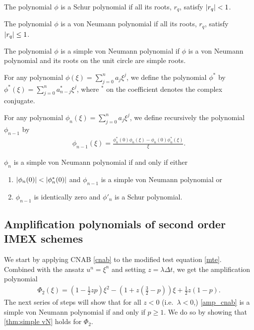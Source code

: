 \begin{definition}
	The polynomial $\phi$ is a Schur polynomial if all its roots, $r_q$, satisfy $\left|r_q\right| < 1$.
\end{definition}
\begin{definition}
        The polynomial $\phi$ is a von Neumann polynomial if all its roots, $r_q$, satisfy $\left|r_q\right|\leq 1$.
\end{definition}
\begin{definition}
	The polynomial $\phi$ is a simple von Neumann polynomial if $\phi$ is a von Neumann polynomial and its roots on the unit circle are simple roots.
\end{definition}
\begin{definition}
	For any polynomial $\phi(\xi) = \sum^n_{j=0} a_j\xi^j$, we define the polynomial $\phi^*$ by $\phi^*(\xi) = \sum^n_{j=0} a^*_{n-j} \xi^j$, where $^*$ on the coefficient denotes the complex conjugate.
\label{defn:conj}
\end{definition}
\begin{definition}
	For any polynomial $\phi_n(\xi) = \sum^n_{j=0} a_j\xi^j$, we define recursively the polynomial $\phi_{n-1}$ by
	\begin{align}
	\phi_{n-1}(\xi) = \frac{\phi_n^*(0)\phi_n(\xi) - \phi_n(0)\phi_n^*(\xi)}{\xi}.
	\end{align} 
\label{defn:recurse}
\end{definition}
\begin{theorem}
	$\phi_n$ is a simple von Neumann polynomial if and only if either 
	\begin{enumerate}[label=(\alph{*})]
		\item $\left|\phi_n(0)\right| < \left|\phi^*_n(0)\right|$ and $\phi_{n-1}$ is a simple von Neumann polynomial or
		
		\item $\phi_{n-1}$ is identically zero and $\phi'_{n}$ is a Schur polynomial.
	\end{enumerate}
\label{thm:simple vN}
\end{theorem}

\subsection{Amplification polynomials of second order IMEX schemes}
We start by applying CNAB \eqref{cnab} to the modified test equation \eqref{mte}. Combined with the ansatz $u^n = \xi^n$ and setting $z=\lambda\Delta t$, we get the amplification polynomial
\begin{align}
\Phi_2(\xi) 
= \left(1 - \frac{1}{2}zp\right)\xi^2
- \left(1 + z\left(\frac{3}{2}-p \right)\right)\xi + \frac{1}{2}z(1-p).
\label{amp_cnab}
\end{align}
The next series of steps will show that for all $z<0$ (i.e.\ $\lambda < 0$,) \eqref{amp_cnab} is a simple von Neumann polynomial if and only if $p\geq 1$. We do so by showing that \cref{thm:simple vN} holds for $\Phi_2$.

